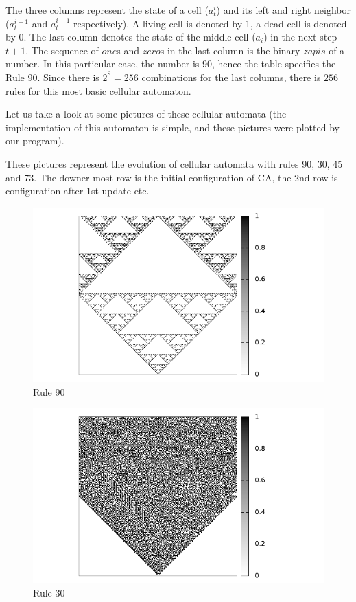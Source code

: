 
The three columns represent the state of a cell ($a_t^i$) and its left and right neighbor ($a_t^{i-1}$ and $a_t^{i+1}$ respectively). A living cell is denoted by 1, a dead cell is denoted by 0. The last column denotes the state of the middle cell ($a_i$) in the next step $t+1$. The sequence of $one$s and $zero$s in the last column is the binary $zapis$ of a number. In this particular case, the number is 90, hence the table specifies the Rule 90.
Since there is $2^8=256$ combinations for the last columns, there is $256$ rules for this most basic cellular automaton.

Let us take a look at some pictures of these cellular automata (the implementation of this automaton is simple, and these pictures were plotted by our program).

These pictures represent the evolution of cellular automata with rules 90, 30, 45 and 73.
The downer-most row is the initial configuration of CA, 
the 2nd row is configuration after 1st update etc.

\begin{figure}
 \centering
 \includegraphics[width=1\textwidth]{./img/rule90}
 \caption{Rule 90}
 \label{koberec}
\end{figure}

\begin{figure}
 \centering
 \includegraphics[width=1\textwidth]{./img/rule30}
 \caption{Rule 30}
\end{figure}

